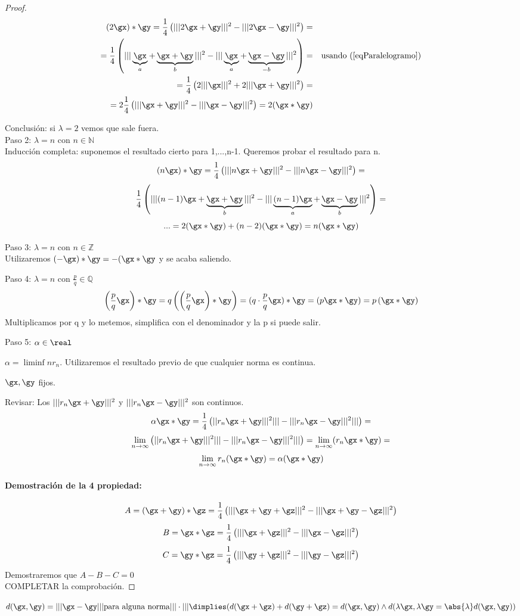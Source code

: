 \documentclass[a4paper,10pt]{apuntes}
\begin{document}
\begin{proof}
\begin{align*}
(2\gx)\ast\gy = \frac{1}{4} \left(|||2\gx+\gy |||^2 - |||2\gx-\gy |||^2\right) = && \\
= \frac{1}{4} \left(|||\underbrace{\gx}_a + \underbrace{\gx+\gy}_b|||^2 - |||\underbrace{\gx}_a+\underbrace{\gx-\gy}_{-b}|||^2\right) = && \text{usando (\ref{eqParalelogramo})} \\
= \frac{1}{4} \left(2|||\gx|||^2 + 2|||\gx + \gy|||^2\right) = && \\
= 2 \frac{1}{4} \left(|||\gx+\gy|||^2 - |||\gx-\gy|||^2\right) = 2 (\gx*\gy) &&
\end{align*}

Conclusión: si $\lambda = 2$ vemos que sale fuera.\\
Paso 2: $\lambda = n$ con $n \in \mathbb{N}$\\
Inducción completa: suponemos el resultado cierto para 1,...,n-1. Queremos probar el resultado para n.
$$(n\gx)*\gy = \frac{1}{4} \left(|||n\gx+\gy|||^2 - |||n\gx-\gy|||^2\right) =$$
$$ \frac{1}{4} \left(|||(n-1)\gx+\underbrace{\gx+\gy}_b|||^2 - |||\underbrace{(n-1)\gx}_a+ \underbrace{\gx-\gy}_b|||^2\right)=$$
$$...=2(\gx*\gy) + (n-2)(\gx*\gy) = n (\gx*\gy)$$

Paso 3: $\lambda = n$ con $n \in \mathbb{Z}$\\
Utilizaremos $(-\gx) * \gy = -(\gx*\gy$ y se acaba saliendo.

Paso 4: $\lambda = n$ con $\frac{p}{q} \in \mathbb{Q}$
$$\left(\frac{p}{q}\gx\right)*\gy = q\left(\left(\frac{p}{q}\gx\right)*\gy\right) = (q\cdot\frac{p}{q}\gx)*\gy = \left(p\gx*\gy\right) = p\left(\gx*\gy\right)$$ Multiplicamos por q y lo metemos, simplifica con el denominador y la p si puede salir.

Paso 5: $\alpha \in \real$

$\alpha = \liminf{n} r_n$. Utilizaremos el resultado previo de que cualquier norma es continua.

$\gx, \gy$ fijos.

Revisar: Los $|||r_n \gx + \gy|||^2$ y  $|||r_n \gx - \gy|||^2$ son continuos.
$$\alpha \gx*\gy = \frac{1}{4}\left(||r_n \gx + \gy|||^2||| -|||r_n \gx - \gy|||^2||| \right) =$$
$$\lim_{n\to\infty} \left(||r_n \gx + \gy|||^2||| -|||r_n \gx - \gy|||^2||| \right) = \lim_{n\to\infty} (r_n\gx*\gy) = $$
$$\lim_{n\to\infty} r_n(\gx*\gy) = \alpha (\gx*\gy)$$
\paragraph{Demostración de la 4 propiedad:}
$$A = (\gx+\gy)*\gz = \frac{1}{4} \left( |||\gx+\gy+\gz|||^2 - |||\gx+\gy-\gz|||^2\right)$$
$$B =\gx*\gz = \frac{1}{4} \left( |||\gx+\gz|||^2 - |||\gx-\gz|||^2\right)$$
$$C =\gy*\gz = \frac{1}{4} \left( |||\gy+\gz|||^2 - |||\gy-\gz|||^2\right)$$
Demostraremos que $A-B-C=0$\\
COMPLETAR la comprobación.
\end{proof}
\begin{remark}
$d(\gx,\gy) = |||\gx-\gy||| \text{para alguna norma}|||\cdot||| \dimplies (d(\gx+\gz)+d(\gy+\gz) = d(\gx,\gy) \wedge d(\lambda \gx,\lambda \gy = \abs{\lambda} d(\gx,\gy))$
\end{remark}
\end{document}

